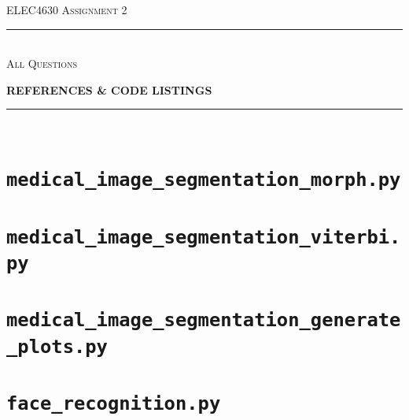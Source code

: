 \begin{titlepage}
  \centering

  \textsc{ELEC4630 Assignment 2}\\
  \vspace{9cm}

  \rule{\linewidth}{0.5pt}\\

  \vspace{1em}
  \LARGE\textsc{All Questions}\\
  \vspace{1em}

  \LARGE\uppercase{\textbf{{References \& Code Listings}}}\\

  \rule{\linewidth}{2pt}\\

  \vfill

\end{titlepage}

\printbibliography

\appendix

\newpage
\section{\texttt{medical\_image\_segmentation\_morph.py}}


\newpage
\section{\texttt{medical\_image\_segmentation\_viterbi.py}}


\newpage
\section{\texttt{medical\_image\_segmentation\_generate\_plots.py}}


% 

\newpage
\section{\texttt{face\_recognition.py}}
